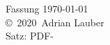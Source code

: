 \documentclass[a4paper,12pt,
headsepline,           %
oneside,               %
pointlessnumbers,      %
bibtotoc,              %
BCOR15mm               %
]{scrbook}
\newcommand{\fullname}{Adrian Lauber}
\newcommand{\jahr}{2020}
\newcommand{\matnr}{1042606}
\begin{document}
\clearpage
\thispagestyle{empty}
{ \small
  \flushleft
  Fassung \today \\\vfill
  \copyright~\jahr~\fullname\\[0.5em]
  Satz: PDF-\LaTeXe
}


\tableofcontents

\mainmatter





\appendix
%

\backmatter

\printbibliography

\clearpage
\thispagestyle{empty}

%
%
%
%
\end{document}
